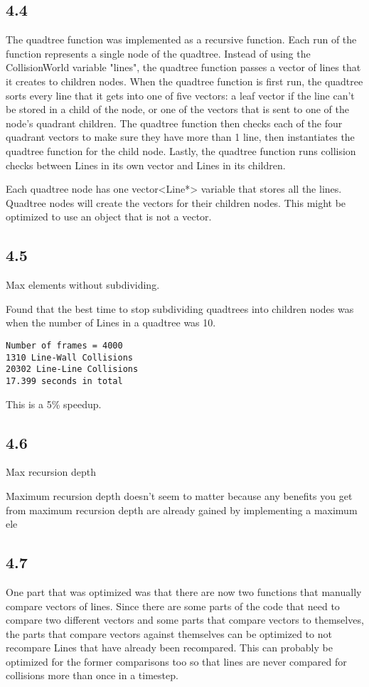 \documentclass[12pt]{article}
\begin{document}
\subsection{4.4}
The quadtree function was implemented as a recursive function.  Each run of the 
function represents a single node of the quadtree.  Instead of using the 
CollisionWorld variable "lines", the quadtree function passes a vector of lines 
that it creates to children nodes.  When the quadtree function is first run, 
the quadtree sorts every line that it gets into one of five vectors: a leaf 
vector if the line can't be stored in a child of the node, or one of the vectors 
that is sent to one of the node's quadrant children.  The quadtree function then 
checks each of the four quadrant vectors to make sure they have more than 1 line, 
then instantiates the quadtree function for the child node.  Lastly, the quadtree 
function runs collision checks between Lines in its own vector and Lines in its 
children.  

Each quadtree node has one 
vector<Line*> variable that stores all the lines.  Quadtree nodes will create 
the vectors for their children nodes.  This might be optimized to use an object 
that is not a vector.


\subsection{4.5}
Max elements without subdividing.

Found that the best time to stop subdividing quadtrees into children nodes 
was when the number of Lines in a quadtree was 10.  
\begin{verbatim}
Number of frames = 4000
1310 Line-Wall Collisions
20302 Line-Line Collisions
17.399 seconds in total
\end{verbatim}
This is a 5\% speedup.  


\subsection{4.6}
Max recursion depth

Maximum recursion depth doesn't seem to matter because any benefits you get 
from maximum recursion depth are already gained by implementing a maximum ele


\subsection{4.7}
One part that was optimized was that there are now two functions that manually 
compare vectors of lines.  Since there are some parts of the code that need to 
compare two different vectors and some parts that compare vectors to themselves, 
the parts that compare vectors against themselves can be optimized to not 
recompare Lines that have already been recompared.  This can probably be 
optimized for the former comparisons too so that lines are never compared for 
collisions more than once in a timestep.  
\end{document}
